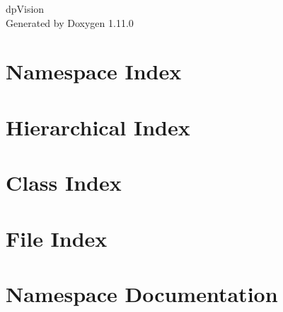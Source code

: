 \documentclass[twoside]{book}
\newcommand{\+}{\discretionary{\mbox{\scriptsize$\hookleftarrow$}}{}{}}
\newcommand{\clearemptydoublepage}{%
    \newpage{\pagestyle{empty}\cleardoublepage}%
  }
\begin{document}
  \raggedbottom
    \hypersetup{pageanchor=false,
                bookmarksnumbered=true,
                pdfencoding=unicode
               }
  \begin{titlepage}
  \vspace*{7cm}
  \begin{center}%
  {\Large dp\+Vision}\\
  \vspace*{1cm}
  {\large Generated by Doxygen 1.11.0}\\
  \end{center}
  \end{titlepage}
  \clearemptydoublepage
  \tableofcontents
  \clearemptydoublepage
  \hypersetup{pageanchor=true}


\chapter{Namespace Index}

\chapter{Hierarchical Index}

\chapter{Class Index}

\chapter{File Index}

\chapter{Namespace Documentation}




















\end{document}

